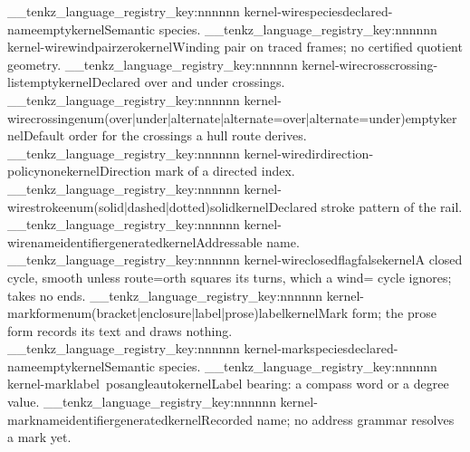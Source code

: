 \__tenkz_language_registry_key:nnnnnn {kernel-wire}{species}{declared-name}{empty}{kernel}{Semantic species.}
\__tenkz_language_registry_key:nnnnnn {kernel-wire}{wind}{pair}{zero}{kernel}{Winding pair on traced frames; no certified quotient geometry.}
\__tenkz_language_registry_key:nnnnnn {kernel-wire}{cross}{crossing-list}{empty}{kernel}{Declared over and under crossings.}
\__tenkz_language_registry_key:nnnnnn {kernel-wire}{crossing}{enum(over|under|alternate|alternate=over|alternate=under)}{empty}{kernel}{Default order for the crossings a hull route derives.}
\__tenkz_language_registry_key:nnnnnn {kernel-wire}{dir}{direction-policy}{none}{kernel}{Direction mark of a directed index.}
\__tenkz_language_registry_key:nnnnnn {kernel-wire}{stroke}{enum(solid|dashed|dotted)}{solid}{kernel}{Declared stroke pattern of the rail.}
\__tenkz_language_registry_key:nnnnnn {kernel-wire}{name}{identifier}{generated}{kernel}{Addressable name.}
\__tenkz_language_registry_key:nnnnnn {kernel-wire}{closed}{flag}{false}{kernel}{A closed cycle, smooth unless route=orth squares its turns, which a wind= cycle ignores; takes no ends.}
\__tenkz_language_registry_key:nnnnnn {kernel-mark}{form}{enum(bracket|enclosure|label|prose)}{label}{kernel}{Mark form; the prose form records its text and draws nothing.}
\__tenkz_language_registry_key:nnnnnn {kernel-mark}{species}{declared-name}{empty}{kernel}{Semantic species.}
\__tenkz_language_registry_key:nnnnnn {kernel-mark}{label~pos}{angle}{auto}{kernel}{Label bearing: a compass word or a degree value.}
\__tenkz_language_registry_key:nnnnnn {kernel-mark}{name}{identifier}{generated}{kernel}{Recorded name; no address grammar resolves a mark yet.}
